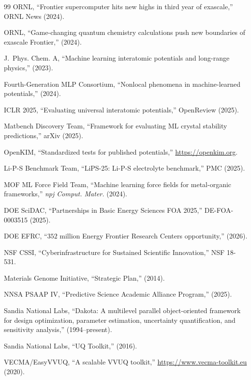\documentclass[11pt,a4paper]{article}
\begin{document}
\begin{thebibliography}{99}
ORNL, ``Frontier supercomputer hits new highs in third year of exascale,'' ORNL News (2024).

ORNL, ``Game-changing quantum chemistry calculations push new boundaries of exascale Frontier,'' (2024).

J.~Phys. Chem. A, ``Machine learning interatomic potentials and long-range physics,'' (2023).

Fourth-Generation MLP Consortium, ``Nonlocal phenomena in machine-learned potentials,'' (2024).

ICLR 2025, ``Evaluating universal interatomic potentials,'' OpenReview (2025).

Matbench Discovery Team, ``Framework for evaluating ML crystal stability predictions,'' arXiv (2025).

OpenKIM, ``Standardized tests for published potentials,'' \url{https://openkim.org}.

Li-P-S Benchmark Team, ``LiPS-25: Li-P-S electrolyte benchmark,'' PMC (2025).

MOF ML Force Field Team, ``Machine learning force fields for metal-organic frameworks,'' \textit{npj Comput. Mater.} (2024).

DOE SciDAC, ``Partnerships in Basic Energy Sciences FOA 2025,'' DE-FOA-0003515 (2025).

DOE EFRC, ``$352$ million Energy Frontier Research Centers opportunity,'' (2026).

NSF CSSI, ``Cyberinfrastructure for Sustained Scientific Innovation,'' NSF 18-531.

Materials Genome Initiative, ``Strategic Plan,'' (2014).

NNSA PSAAP IV, ``Predictive Science Academic Alliance Program,'' (2025).

Sandia National Labs, ``Dakota: A multilevel parallel object-oriented framework for design optimization, parameter estimation, uncertainty quantification, and sensitivity analysis,'' (1994--present).

Sandia National Labs, ``UQ Toolkit,'' (2016).

VECMA/EasyVVUQ, ``A scalable VVUQ toolkit,'' \url{https://www.vecma-toolkit.eu} (2020).


\end{thebibliography}
\end{document}
